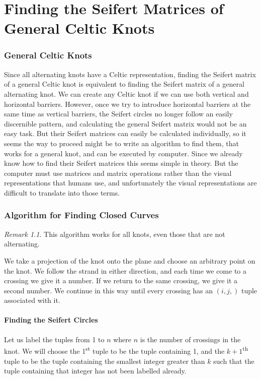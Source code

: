 \documentclass[10pt,a4paper]{report}
\theoremstyle{definition}
\theoremstyle{remark}
\newtheorem*{remark}{Remark}
\theoremstyle{example}
\begin{document}
 \chapter{Finding the Seifert Matrices of General Celtic Knots}
 \subsection{General Celtic Knots}
 Since all alternating knots have a Celtic representation, finding the Seifert matrix of a general Celtic knot is equivalent to finding the Seifert matrix of a general alternating knot. We can create any Celtic knot if we can use both vertical and horizontal barriers. However, once we try to introduce horizontal barriers at the same time as vertical barriers, the Seifert circles no longer follow an easily discernible pattern, and calculating the general Seifert matrix would not be an easy task. But their Seifert matrices can easily be calculated individually, so it seems the way to proceed might be to write an algorithm to find them, that works for a general knot, and can be executed by computer. Since we already know how to find their Seifert matrices this seems simple in theory. But the computer must use matrices and matrix operations rather than the visual representations that humans use, and unfortunately the visual representations are difficult to translate into those terms.
  \subsection{Algorithm for Finding Closed Curves}
  \begin{remark}
This algorithm works for all knots, even those that are not alternating. 
\end{remark}
 We take a projection of the knot onto the plane and choose an arbitrary point on the knot. We follow the strand in either direction, and each time we come to a crossing we give it a number. If we return to the same crossing, we give it a second number. We continue in this way until every crossing has an $(i,j,)$ tuple associated with it. 
\subsubsection{Finding the Seifert Circles}
 Let us label the tuples from 1 to $n$ where $n$ is the number of crossings in the knot. We will choose the 1\textsuperscript{st} tuple to be the tuple containing 1, and the ${k+1}$\textsuperscript{th} tuple to be the tuple containing the smallest integer greater than $k$ such that the tuple containing that integer has not been labelled already. 
 
\end{document}
